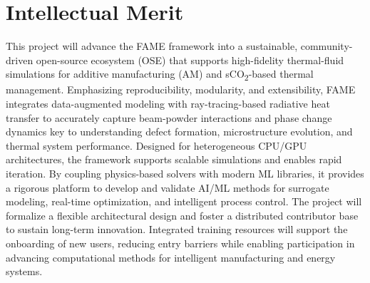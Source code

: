 \documentclass[11pt]{article}
\newcommand{\CO}[1]{CO\textsubscript{#1}}
\begin{document}
\section*{Intellectual Merit}
\vspace{-3pt}
\noindent
This project will advance the FAME framework into a sustainable, community-driven open-source ecosystem (OSE) that supports high-fidelity thermal-fluid simulations for additive manufacturing (AM) and s\CO{2}-based thermal management. Emphasizing reproducibility, modularity, and extensibility, FAME integrates data-augmented modeling with ray-tracing-based radiative heat transfer to accurately capture beam-powder interactions and phase change dynamics key to understanding defect formation, microstructure evolution, and thermal system performance. Designed for heterogeneous CPU/GPU architectures, the framework supports scalable simulations and enables rapid iteration. By coupling physics-based solvers with modern ML libraries, it provides a rigorous platform to develop and validate AI/ML methods for surrogate modeling, real-time optimization, and intelligent process control. The project will formalize a flexible architectural design and foster a distributed contributor base to sustain long-term innovation. Integrated training resources will support the onboarding of new users, reducing entry barriers while enabling participation in advancing computational methods for intelligent manufacturing and energy systems.
\vspace{-3pt}
\end{document}
